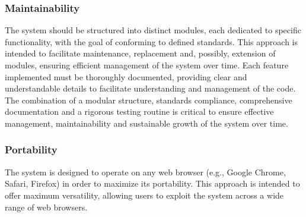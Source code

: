 \subsubsection{Maintainability}
The system should be structured into distinct modules, each dedicated to specific functionality, with the goal of conforming to defined standards. This approach is intended to facilitate maintenance, replacement and, possibly, extension of modules, ensuring efficient management of the system over time. Each feature implemented must be thoroughly documented, providing clear and understandable details to facilitate understanding and management of the code. The combination of a modular structure, standards compliance, comprehensive documentation and a rigorous testing routine is critical to ensure effective management, maintainability and sustainable growth of the system over time.


\subsubsection{Portability}
The system is designed to operate on any web browser (e.g., Google Chrome, Safari, Firefox) in order to maximize its portability. This approach is intended to offer maximum versatility, allowing users to exploit the system across a wide range of web browsers.








